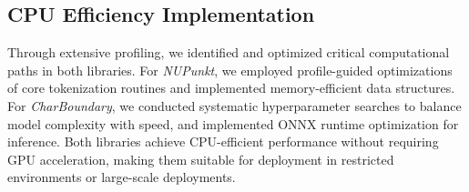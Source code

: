 \subsection{CPU Efficiency Implementation}
Through extensive profiling, we identified and optimized critical computational paths in both libraries. For \textit{NUPunkt}, we employed profile-guided optimizations of core tokenization routines and implemented memory-efficient data structures. For \textit{CharBoundary}, we conducted systematic hyperparameter searches to balance model complexity with speed, and implemented ONNX runtime optimization for inference. Both libraries achieve CPU-efficient performance without requiring GPU acceleration, making them suitable for deployment in restricted environments or large-scale deployments.

